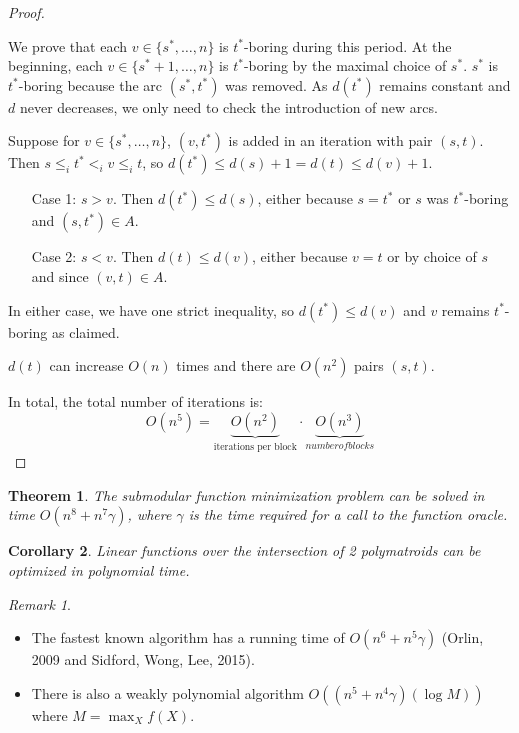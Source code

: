 \documentclass[11pt, a4paper]{article}
\newcommand{\set}[1]{\{#1\}}
\newtheorem{theorem}{Theorem}[section]
\newtheorem{cor}[theorem]{Corollary}
\theoremstyle{remark}
\newtheorem*{uremark}{Remark}
\theoremstyle{definition}
\begin{document}
\begin{proof}
\begin{itemize}
		We prove that each $v\in \set{s^*,\ldots,n}$ is
		$t^*$-boring during this period. At the beginning, each $v\in \set{s^*
		+1,\ldots,n}$ is $t^*$-boring by the maximal choice of $s^*$. $s^*$
		is $t^*$-boring because the arc $(s^*,t^*)$ was removed. As $d(t^*)$
		remains constant and $d$ never decreases, we only need to check the
		introduction of new arcs.

		Suppose for $v\in\set{s^*,\ldots,n}$, $(v,t^*)$ is added in an iteration
		with pair $(s,t)$. Then $s\leq_i t^*<_i v\leq_i t$, so
		$d(t^*)\leq d(s)+1=d(t)\leq d(v)+1$.
		\begin{enumerate}
			\item[Case 1:]
			$s>v$. Then $d(t^*)\leq d(s)$, either because $s=t^*$ or $s$ was
			$t^*$-boring and $(s,t^*)\in A$.

			\item[Case 2:]
			$s<v$. Then $d(t)\leq d(v)$, either because $v=t$ or by choice of $s$
			and since $(v,t)\in A$.
		\end{enumerate}
		In either case, we have one strict inequality, so $d(t^*)\leq d(v)$
		and $v$ remains $t^*$-boring as claimed.

		$d(t)$ can increase $O(n)$ times and there are $O(n^2)$ pairs $(s,t)$.
	\end{itemize}
	In total, the total number of iterations is:
	\[O(n^5)=\underbrace{O(n^2)}_{\text{iterations per block}}
		\cdot\underbrace{O(n^3)}_{number of blocks}\]
\end{proof}

\begin{theorem}
	The submodular function minimization problem can be solved in time
	$O(n^8+n^7\gamma)$, where $\gamma$ is the time required for a call to
	the function oracle.
\end{theorem}

\begin{cor}
	Linear functions over the intersection of 2 polymatroids can be optimized
	in polynomial time.
\end{cor}

\begin{uremark}\ 
	\begin{itemize}
		\item
		The fastest known algorithm has a running time of $O(n^6+n^5\gamma)$
		(Orlin, 2009 and Sidford, Wong, Lee, 2015).

		\item
		There is also a weakly polynomial algorithm $O((n^5+n^4\gamma)(\log M))$
		where $M=\max_{X}f(X)$.
	\end{itemize}
\end{uremark}
\end{document}

